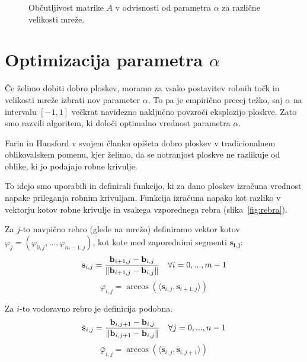 \documentclass[twocolumn, 10pt]{article}    %
\begin{document}
\begin{figure}
    \centering
    \resizebox*{!}{7cm}{}
    \caption{Občutljivost matrike $A$ v odvisnosti od parametra $\alpha$ za različne velikosti mreže.}
    \label{fig:obcutljivosti}
\end{figure}

\section{Optimizacija parametra $\alpha$}
\label{optimizacija}
Če želimo dobiti dobro ploskev, moramo za vsako postavitev robnih točk in velikosti mreže izbrati nov parameter $\alpha$.
To pa je empirično precej težko, saj $\alpha$ na intervalu $[-1, 1]$ večkrat navidezno naključno povzroči eksplozijo ploskve. Zato smo razvili algoritem, ki določi optimalno vrednost parametra $\alpha$.

Farin in Hansford v svojem članku \cite{FARIN1999691} opišeta dobro ploskev v tradicionalnem oblikovalskem pomenu, kjer želimo, da se notranjost ploskve ne razlikuje od oblike, ki jo podajajo robne krivulje.

To idejo smo uporabili in definirali funkcijo, ki za dano ploskev izračuna vrednost napake prileganja robnim krivuljam. Funkcija izračuna napako kot razliko v vektorju kotov robne krivulje in vsakega vzporednega rebra (slika~\ref{fig:rebra}).

Za $j$-to navpično rebro (glede na mrežo) definiramo vektor kotov $\varphi_j = (\varphi_{0,j}, \dots, \varphi_{m-1, j})$, kot kote med zaporednimi segmenti $\mathbf{s_{i,j}}$:
\begin{equation}
    \mathbf{s}_{i,j} = \frac{\mathbf{b}_{i+1,j} - \mathbf{b}_{i,j}}{\|\mathbf{b}_{i+1,j} - \mathbf{b}_{i,j}\|} \quad \forall i = 0, ..., m-1 \\
\end{equation}
\begin{equation}
    \varphi_{i,j} = \arccos\left(\langle \mathbf{s}_{i,j}, \mathbf{s}_{i+1,j}\rangle\right)
\end{equation}

Za $i$-to vodoravno rebro je definicija podobna.
\begin{equation}
    \bar{\mathbf{s}}_{i,j} = \frac{\mathbf{b}_{i,j+1} - \mathbf{b}_{i,j}}{\|\mathbf{b}_{i,j+1} - \mathbf{b}_{i,j}\|} \quad \forall j = 0, ..., n-1 \\
\end{equation}
\begin{equation}
    \bar{\varphi}_{i,j} = \arccos\left(\langle \bar{\mathbf{s}}_{i,j}, \bar{\mathbf{s}}_{i,j+1}\rangle\right)
\end{equation}
\end{document}
